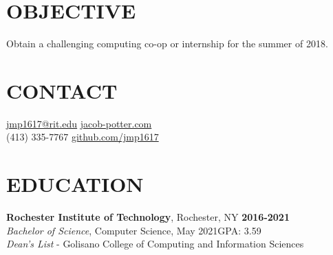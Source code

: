\documentclass[line,margin]{res}
\begin{document}
\begin{resume}

\section{OBJECTIVE}
Obtain a challenging computing co-op or internship for the summer of 2018.

\section{CONTACT}
\href{mailto:jmp1617@rit.edu}{jmp1617@rit.edu}\hfill 
\href{https://jacob-potter.com}{jacob-potter.com}\\
(413) 335-7767\hfill 
\href{https://github.com/jmp1617}{github.com/jmp1617}

\section{EDUCATION}
\textbf{Rochester Institute of Technology}, Rochester, NY\hfill
    \textbf{2016-2021}\\
{\sl Bachelor of Science}, Computer Science, May 2021\hfill GPA: 3.59
\\
{\sl Dean's List} - Golisano College of Computing and Information Sciences


\end{resume}
\end{document}
